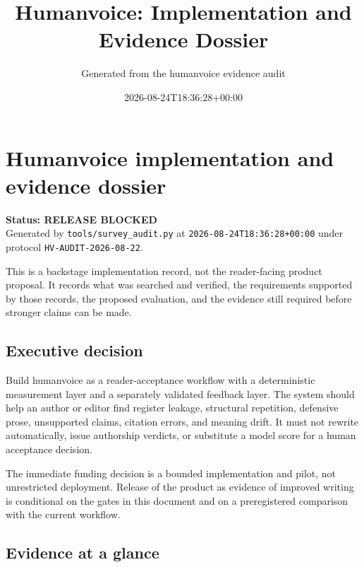 \documentclass[11pt]{article}
\title{Humanvoice: Implementation and Evidence Dossier}
\author{Generated from the humanvoice evidence audit}
\date{2026-08-24T18:36:28+00:00}
\begin{document}
\hypertarget{humanvoice-implementation-and-evidence-dossier}{%
\section{Humanvoice implementation and evidence dossier}\label{humanvoice-implementation-and-evidence-dossier}}

\textbf{Status: RELEASE BLOCKED}\\
Generated by \texttt{tools/survey\_audit.py} at \texttt{2026-08-24T18:36:28+00:00} under protocol \texttt{HV-AUDIT-2026-08-22}.

This is a backstage implementation record, not the reader-facing product proposal. It records what was searched and verified, the requirements supported by those records, the proposed evaluation, and the evidence still required before stronger claims can be made.

\hypertarget{executive-decision}{%
\subsection{Executive decision}\label{executive-decision}}

Build humanvoice as a reader-acceptance workflow with a deterministic measurement layer and a separately validated feedback layer. The system should help an author or editor find register leakage, structural repetition, defensive prose, unsupported claims, citation errors, and meaning drift. It must not rewrite automatically, issue authorship verdicts, or substitute a model score for a human acceptance decision.

The immediate funding decision is a bounded implementation and pilot, not unrestricted deployment. Release of the product as evidence of improved writing is conditional on the gates in this document and on a preregistered comparison with the current workflow.

\hypertarget{evidence-at-a-glance}{%
\subsection{Evidence at a glance}\label{evidence-at-a-glance}}
\end{document}
